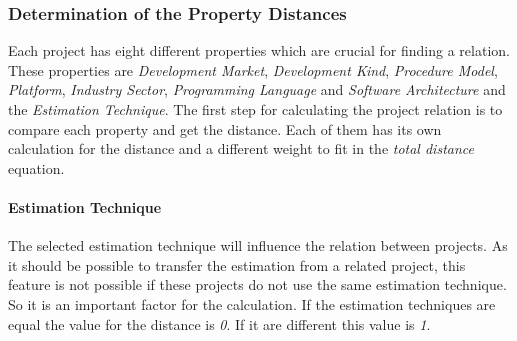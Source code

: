 \subsubsection{\textbf{Determination of the Property Distances}}
Each project has eight different properties which are crucial for finding a relation. These properties are \textit{Development Market}, \textit{Development Kind}, \textit{Procedure Model}, \textit{Platform}, \textit{Industry Sector}, \textit{Programming Language} and \textit{Software Architecture} and the \textit{Estimation Technique}. The first step for calculating the project relation is to compare each property and get the distance. Each of them has its own calculation for the distance and a different weight to fit in the \textit{total distance} equation. 

\paragraph*{\textbf{Estimation Technique}}

The selected estimation technique will influence the relation between projects. As it should be possible to transfer the estimation from a related project, this feature is not possible if these projects do not use the same estimation technique. So it is an important factor for the calculation. If the estimation techniques are equal the value for the distance is \textit{0}. If it are different this value is \textit{1}.

